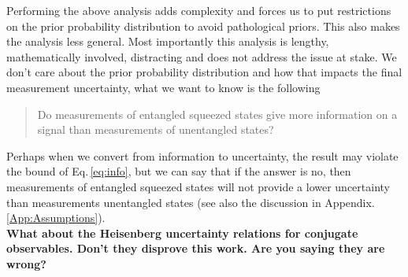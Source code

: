\documentclass[reqno]{amsart}
\begin{document}
Performing the above analysis adds complexity and forces us to put restrictions on the prior probability distribution to avoid pathological priors. This also makes the analysis less general. Most importantly this analysis is lengthy, mathematically involved, distracting and does not address the issue at stake. We don't care about the prior probability distribution and how that impacts the final measurement uncertainty, what we want to know is the following
\begin{quotation}
Do measurements of entangled squeezed states give more information on a signal than measurements of unentangled states?
\end{quotation}
Perhaps when we convert from information to uncertainty, the result may violate the bound of Eq.\,\eqref{eq:info}, but we can say that if the answer is no, then measurements of entangled squeezed states will not provide a lower uncertainty than measurements unentangled states (see also the discussion in Appendix.\,\ref{App:Assumptions}).\\

\noindent\textbf{What about the Heisenberg uncertainty relations for conjugate observables. Don't they disprove this work. Are you saying they are wrong?}
\end{document}
